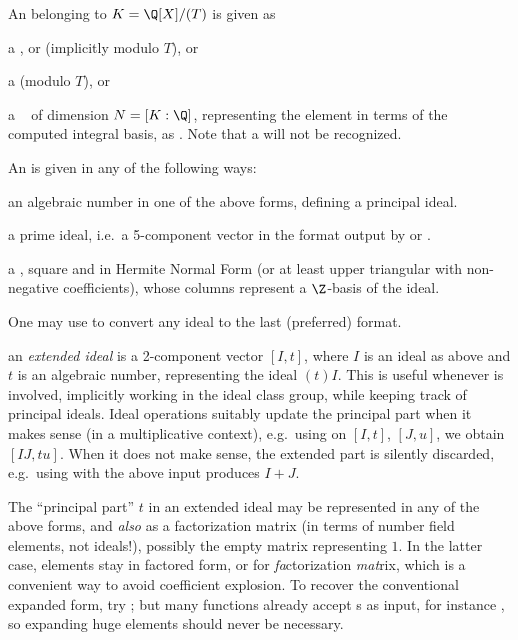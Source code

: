
\noindent An  belonging to $K = \Q[X]/(T)$ is given as

\item a ,  or  (implicitly modulo $T$), or

\item a  (modulo $T$), or

\item a ~ of dimension $N = [K:\Q]$, representing
the element in terms of the computed integral basis, as
. Note that a 
will not be recognized.
\medskip

\noindent An  is given in any of the following ways:

\item an algebraic number in one of the above forms, defining a principal ideal.

\item a prime ideal, i.e.~a 5-component vector in the format output by
 or .

\item a , square and in Hermite Normal Form (or at least
upper triangular with non-negative coefficients), whose columns represent a
$\Z$-basis of the ideal.

One may use  to convert any ideal to the last (preferred) format.

\item an \emph{extended ideal}  is a 2-component
vector $[I, t]$, where $I$ is an ideal as above and $t$ is an algebraic
number, representing the ideal $(t)I$. This is useful whenever 
is involved, implicitly working in the ideal class group, while keeping track
of principal ideals. Ideal operations suitably update the principal part
when it makes sense (in a multiplicative context), e.g.~using 
on $[I,t]$, $[J,u]$, we obtain $[IJ, tu]$. When it does not make sense, the
extended part is silently discarded, e.g.~using  with the above
input produces $I+J$.

The ``principal part'' $t$ in an extended ideal may be
represented in any of the above forms, and \emph{also} as a factorization
matrix (in terms of number field elements, not ideals!), possibly the empty
matrix \kbd{[;]} representing $1$. In the latter case, elements stay in
factored form, or  for \emph{fa}ctorization \emph{mat}rix, which
is a convenient way to avoid coefficient explosion. To recover the
conventional expanded form, try ; but many functions
already accept s as input, for instance , so
expanding huge elements should never be necessary.

